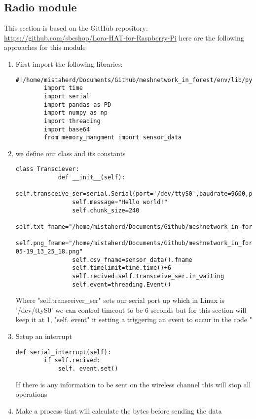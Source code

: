 \subsection{Radio module}
This section is based on the GitHub repository: \url{https://github.com/sbcshop/Lora-HAT-for-Raspberry-Pi}
here are the following approaches for this module
\begin{enumerate}
    \item First import the following  libraries:
    \begin{lstlisting}[style=mystyle]
        #!/home/mistaherd/Documents/Github/meshnetwork_in_forest/env/lib/python3.11
        import time
        import serial
        import pandas as PD
        import numpy as np
        import threading
        import base64
        from memory_mangment import sensor_data
    \end{lstlisting}
    \item we define our  class and its  constants
    \begin{lstlisting}[style=mystyle]
        class Transciever:
            def __init__(self):
                self.transceive_ser=serial.Serial(port='/dev/ttyS0',baudrate=9600,parity=serial.PARITY_NONE,stopbits=serial.STOPBITS_ONE,bytesize=serial.EIGHTBITS,timeout=1)
                self.message="Hello world!"
                self.chunk_size=240
                self.txt_fname="/home/mistaherd/Documents/Github/meshnetwork_in_forest/Tests/transmited_text.txt"
                self.png_fname="/home/mistaherd/Documents/Github/meshnetwork_in_forest/Images_camera/camera_output_2024-05-19_13_25_18.png"
                self.csv_fname=sensor_data().fname
                self.timelimit=time.time()+6
                self.recived=self.transceive_ser.in_waiting
                self.event=threading.Event()
    \end{lstlisting}
    
    Where "self.transceiver\_ser" sets our serial port up which in Linux is  '/dev/ttyS0' we can  control timeout to be  6 seconds but for this section will keep it at 1, "self. event" it setting  a triggering an event to occur in the code "

    \item Setup an interrupt
    \begin{lstlisting}[style=mystyle]
        def serial_interrupt(self):
		if self.recived:
			self. event.set()
    \end{lstlisting}
    
    If there is any information to be sent on the wireless channel this will stop all operations
    \item Make a process that will calculate the bytes  before sending the data


\end{enumerate}
